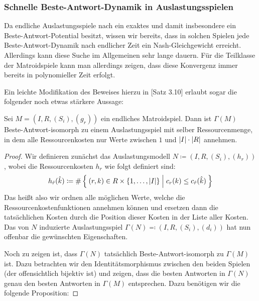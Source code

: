 

\subsubsection{Schnelle Beste-Antwort-Dynamik in Auslastungsspielen}

Da endliche Auslastungsspiele nach  ein exaktes und damit insbesondere ein Beste-Antwort-Potential besitzt, wissen wir bereits, dass in solchen Spielen jede Beste-Antwort-Dynamik nach endlicher Zeit ein Nash-Gleichgewicht erreicht. Allerdings kann diese Suche im Allgemeinen sehr lange dauern. Für die Teilklasse der Matroidspiele kann man allerdings zeigen, dass diese Konvergenz immer bereits in polynomieller Zeit erfolgt.

Ein leichte Modifikation des Beweises hierzu in \cite{OptiIVSkript}[Satz 3.10] erlaubt sogar die folgender noch etwas stärkere Aussage:

\begin{satz}\label{satz:BAPotentialFuerMatroidspiele}
	Sei $M = (I, R, (S_i), (g_r))$ ein endliches Matroidspiel. Dann ist $\Gamma(M)$ Beste-Antwort-isomorph zu einem Auslastungsspiel mit selber Ressourcenmenge, in dem alle Ressourcenkosten nur Werte zwischen $1$ und $\left|I\right|\cdot\left|R\right|$ annehmen.
\end{satz}

\begin{proof}
	Wir definieren zunächst das Auslastungsmodell $N \coloneqq (I, R, (S_i), (h_r))$, wobei die Ressourcenkosten $h_r$ wie folgt definiert sind:
		\[h_{\hat{r}}(\hat{k}) \coloneqq \#\Set{(r, k) \in R\times \{1, \dots, \left|I\right|\} | c_r(k) \leq c_{\hat{r}}(\hat{k})} \]
	Das heißt also wir ordnen alle möglichen Werte, welche die Ressourcenkostenfunktionen annehmen können und ersetzen dann die tatsächlichen Kosten durch die Position dieser Kosten in der Liste aller Kosten. Das von $N$ induzierte Auslastungsspiel $\Gamma(N) \eqqcolon (I, R, (S_i), (d_i))$ hat nun offenbar die gewünschten Eigenschaften. 
	
	Noch zu zeigen ist, dass $\Gamma(N)$ tatsächlich Beste-Antwort-isomorph zu $\Gamma(M)$ ist. Dazu betrachten wir den Identitätsmorphismus zwischen den beiden Spielen (der offensichtlich bijektiv ist) und zeigen, dass die besten Antworten in $\Gamma(N)$ genau den besten Antworten in $\Gamma(M)$ entsprechen. Dazu benötigen wir die folgende Proposition:	\noqed
\end{proof}
	
